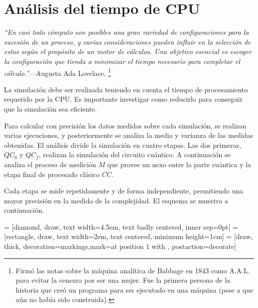 \section{Análisis del tiempo de CPU}
\textsl{``En casi todo cómputo son posibles una gran variedad de configuraciones 
para la sucesión de un proceso, y varias consideraciones pueden influir en la 
selección de estas según el propósito de un motor de cálculos. Una objetivo 
esencial es escoger la configuración que tienda a minimizar el tiempo necesario 
para completar el cálculo.''}---Augusta Ada Lovelace.
\footnote{Firmó las notas sobre la máquina analítica de Babbage en 1843 como 
A.A.L. para evitar la censura por ser una mujer. Fue la primera persona de la 
historia que creó un programa para ser ejecutado en una máquina (pese a que aún 
no había sido construida).}
\newline

La simulación debe ser realizada teniendo en cuenta el tiempo de procesamiento 
requerido por la CPU. Es importante investigar como reducirlo para conseguir que 
la simulación sea eficiente.

Para calcular con precisión los datos medidos sobre cada simulación, se realizan 
varias ejecuciones, y posteriormente se analiza la media y varianza de las 
medidas obtenidas. El análisis divide la simulación en cuatro etapas. Las dos 
primeras, $QC_0$ y $QC_f$, realizan la simulación del circuito cuántico. A 
continuación se analiza el proceso de medición $M$ que provee un nexo entre la 
parte cuántica y la etapa final de procesado clásico $CC$.

Cada etapa se mide repetidamente y de forma independiente, permitiendo una mayor 
precisión en la medida de la complejidad. El esquema se muestra a continuación.
%
\begin{center}
 = [diamond, draw, text width=4.5em, text badly centered, 
inner sep=0pt]
 = [rectangle, draw, text width=2em, text centered, minimum 
height=1cm]
 = [draw, thick, decoration={markings,mark=at position 
1 with {}}, postaction={decorate}]
%
\end{center}
%

